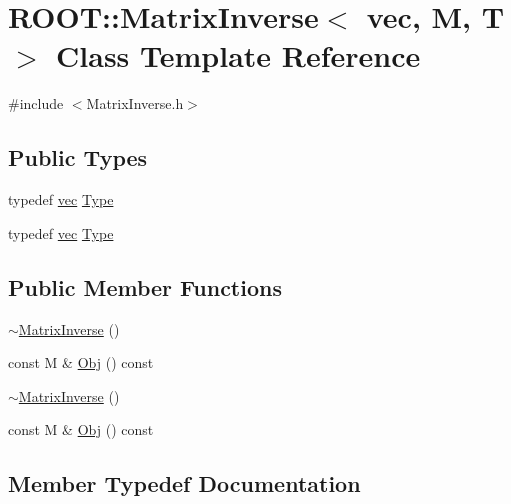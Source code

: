 \hypertarget{classROOT_1_1Minuit2_1_1MatrixInverse_3_01vec_00_01M_00_01T_01_4}{}\section{R\+O\+OT\+:\+:Matrix\+Inverse$<$ vec, M, T $>$ Class Template Reference}
\label{classROOT_1_1Minuit2_1_1MatrixInverse_3_01vec_00_01M_00_01T_01_4}


{\ttfamily \#include $<$Matrix\+Inverse.\+h$>$}

\subsection*{Public Types}
\begin{DoxyCompactItemize}
\item 
typedef \mbox{\hyperlink{classROOT_1_1Minuit2_1_1vec}{vec}} \mbox{\hyperlink{classROOT_1_1Minuit2_1_1MatrixInverse_3_01vec_00_01M_00_01T_01_4_ae925e39424dcc097f76d033365b06efd}{Type}}
\item 
typedef \mbox{\hyperlink{classROOT_1_1Minuit2_1_1vec}{vec}} \mbox{\hyperlink{classROOT_1_1Minuit2_1_1MatrixInverse_3_01vec_00_01M_00_01T_01_4_ae925e39424dcc097f76d033365b06efd}{Type}}
\end{DoxyCompactItemize}
\subsection*{Public Member Functions}
\begin{DoxyCompactItemize}
\item 
\mbox{\hyperlink{classROOT_1_1Minuit2_1_1MatrixInverse_3_01vec_00_01M_00_01T_01_4_ad267e62bc46dd1bab57b3194bd850be9}{$\sim$\+Matrix\+Inverse}} ()
\item 
const M \& \mbox{\hyperlink{classROOT_1_1Minuit2_1_1MatrixInverse_3_01vec_00_01M_00_01T_01_4_a9d034050e7fbadfbbf24613a54c8ed93}{Obj}} () const
\item 
\mbox{\hyperlink{classROOT_1_1Minuit2_1_1MatrixInverse_3_01vec_00_01M_00_01T_01_4_ad267e62bc46dd1bab57b3194bd850be9}{$\sim$\+Matrix\+Inverse}} ()
\item 
const M \& \mbox{\hyperlink{classROOT_1_1Minuit2_1_1MatrixInverse_3_01vec_00_01M_00_01T_01_4_a9d034050e7fbadfbbf24613a54c8ed93}{Obj}} () const
\end{DoxyCompactItemize}


\subsection{Member Typedef Documentation}
\mbox{\label{classROOT_1_1Minuit2_1_1MatrixInverse_3_01vec_00_01M_00_01T_01_4_ae925e39424dcc097f76d033365b06efd}} 
